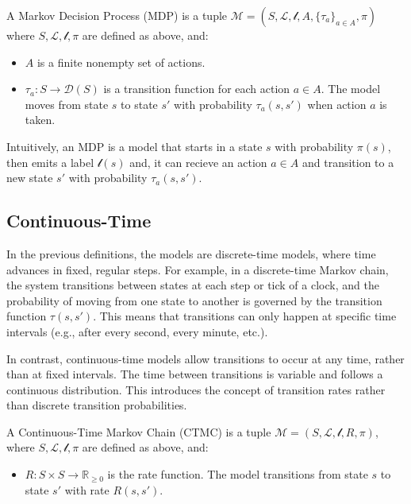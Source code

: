 \begin{definition}
    A Markov Decision Process (MDP) is a tuple $\mathcal{M} = (S, \mathcal{L}, \mathscr{l}, A, \{\tau_a\}_{a \in A}, \pi)$ where $S, \mathcal{L}, \mathscr{l}, \pi$ are defined as above, and:
    \begin{itemize}
        \item $A$ is a finite nonempty set of actions.
        \item $\tau_a: S \rightarrow \mathcal{D}(S)$ is a transition function for each action $a \in A$. The model moves from state $s$ to state $s'$ with probability $\tau_a(s, s')$ when action $a$ is taken.
    \end{itemize}
\end{definition}


Intuitively, an MDP is a model that starts in a state $s$ with probability $\pi(s)$, then emits a label $\mathscr{l}(s)$ and, it can recieve an action $a \in A$ and transition to a new state $s'$ with probability $\tau_a(s, s')$.


\subsection{Continuous-Time}
In the previous definitions, the models are discrete-time models, where time advances in fixed, regular steps. 
For example, in a discrete-time Markov chain, the system transitions between states at each step or tick of a clock, and the probability of moving from one state to another is governed by the transition function $\tau(s, s')$. 
This means that transitions can only happen at specific time intervals (e.g., after every second, every minute, etc.).

In contrast, continuous-time models allow transitions to occur at any time, rather than at fixed intervals. 
The time between transitions is variable and follows a continuous distribution. 
This introduces the concept of transition rates rather than discrete transition probabilities.


\begin{definition}
    A Continuous-Time Markov Chain (CTMC) is a tuple $\mathcal{M} = (S, \mathcal{L}, \mathscr{l}, R, \pi)$, where $S, \mathcal{L}, \mathscr{l}, \pi$ are defined as above, and:
    \begin{itemize}
        \item $R: S \times S \rightarrow \mathbb{R}_{\geq 0}$ is the rate function. The model transitions from state $s$ to state $s'$ with rate $R(s, s')$.
    \end{itemize}
\end{definition}


